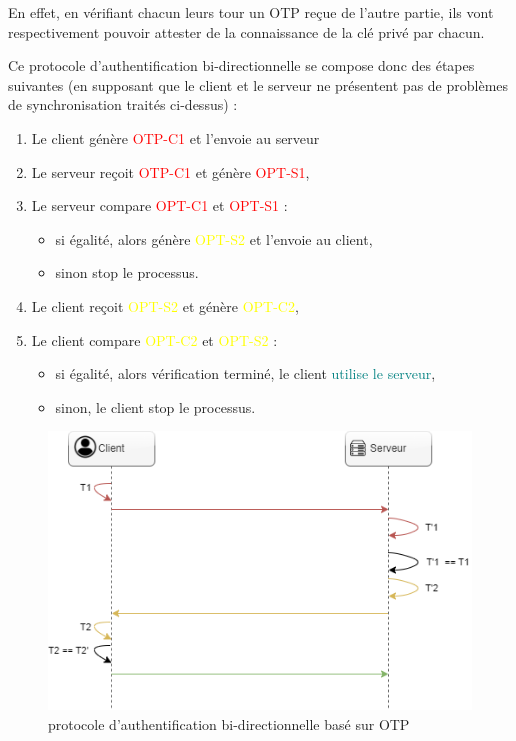 \documentclass[a4paper, 10pt]{article}
\newcommand{\otp}{\textsc{OTP} }
\begin{document}
En effet, en vérifiant chacun leurs tour un \otp reçue de l'autre partie, ils vont respectivement pouvoir \textcolor{myblue}{attester de la connaissance
de la clé privé par chacun}.

Ce protocole d'authentification bi-directionnelle se compose donc des étapes suivantes 
(en supposant que le client et le serveur ne présentent pas de problèmes de synchronisation traités ci-dessus) :
\begin{enumerate}
    \item Le client génère \textcolor{red}{OTP-C1} et l'envoie au serveur
    \item Le serveur reçoit \textcolor{red}{OTP-C1} et génère \textcolor{red}{OPT-S1},
    \item Le serveur compare \textcolor{red}{OPT-C1} et \textcolor{red}{OPT-S1} :
        \begin{itemize}
            \item si égalité, alors génère \textcolor{yellow}{OPT-S2} et l'envoie au client,
            \item sinon stop le processus.
        \end{itemize}
    \item Le client reçoit\textcolor{yellow}{ OPT-S2} et génère \textcolor{yellow}{OPT-C2},
    \item Le client compare \textcolor{yellow}{OPT-C2} et \textcolor{yellow}{OPT-S2} :
        \begin{itemize}
            \item si égalité, alors vérification terminé, le client \textcolor{teal}{utilise le serveur},
            \item sinon, le client stop le processus.\\
        \end{itemize}
\end{enumerate}

\begin{figure}[H]
        \centering
        \includegraphics[scale=0.5]{img/1/5/auth-bi-dir.drawio.png}
        \caption{protocole d'authentification bi-directionnelle basé sur \otp}
        \label{fig:hotp-resync}
\end{figure}
\end{document}
